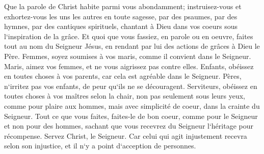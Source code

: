 \verse Que la parole de Christ habite parmi vous abondamment; instruisez-vous et exhortez-vous les uns les autres en toute sagesse, par des psaumes, par des hymnes, par des cantiques spirituels, chantant à Dieu dans vos coeurs sous l`inspiration de la grâce. 
\verse Et quoi que vous fassiez, en parole ou en oeuvre, faites tout au nom du Seigneur Jésus, en rendant par lui des actions de grâces à Dieu le Père. 
\verse Femmes, soyez soumises à vos maris, comme il convient dans le Seigneur. 
\verse Maris, aimez vos femmes, et ne vous aigrissez pas contre elles. 
\verse Enfants, obéissez en toutes choses à vos parents, car cela est agréable dans le Seigneur. 
\verse Pères, n`irritez pas vos enfants, de peur qu`ils ne se découragent. 
\verse Serviteurs, obéissez en toutes choses à vos maîtres selon la chair, non pas seulement sous leurs yeux, comme pour plaire aux hommes, mais avec simplicité de coeur, dans la crainte du Seigneur. 
\verse Tout ce que vous faites, faites-le de bon coeur, comme pour le Seigneur et non pour des hommes, 
\verse sachant que vous recevrez du Seigneur l`héritage pour récompense. Servez Christ, le Seigneur. 
\verse Car celui qui agit injustement recevra selon son injustice, et il n`y a point d`acception de personnes. 

